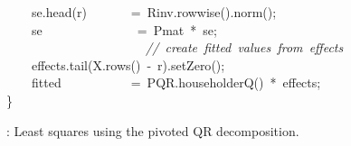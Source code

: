 \documentclass[shortnames,article]{jss}
\newcommand{\hlstd}[1]{\textcolor[rgb]{0,0,0}{#1}}
\newcommand{\hlopt}[1]{\textcolor[rgb]{0,0,0}{#1}}
\newcommand{\hlslc}[1]{\textcolor[rgb]{0.67,0.13,0.13}{\it{#1}}}
\newcommand{\hlkwd}[1]{\textcolor[rgb]{0,0,0}{#1}}
\begin{document}
\begin{figure}[htb]
    \hlstd{}\hlstd{\ \ \ \ }\hlstd{se}\hlopt{.}\hlstd{}\hlkwd{head}\hlstd{}\hlopt{(}\hlstd{r}\hlopt{)}\hlstd{\ \ \ \ \ \ \ }\hlopt{=\ }\hlstd{Rinv}\hlopt{.}\hlstd{}\hlkwd{rowwise}\hlstd{}\hlopt{().}\hlstd{}\hlkwd{norm}\hlstd{}\hlopt{();}\hspace*{\fill}\\
    \hlstd{}\hlstd{\ \ \ \ }\hlstd{se}\hlstd{\ \ \ \ \ \ \ \ \ \ \ \ \ \ \ }\hlstd{}\hlopt{=\ }\hlstd{Pmat\ }\hlopt{{*}\ }\hlstd{se}\hlopt{;}\hspace*{\fill}\\
    \hlstd{}\hlstd{\ \ \ \ \ \ \ \ \ \ \ \ \ \ \ \ \ \ \ \ \ \ }\hlstd{}\hlslc{//\ create\ fitted\ values\ from\ effects}\hspace*{\fill}\\
    \hlstd{}\hlstd{\ \ \ \ }\hlstd{effects}\hlopt{.}\hlstd{}\hlkwd{tail}\hlstd{}\hlopt{(}\hlstd{X}\hlopt{.}\hlstd{}\hlkwd{rows}\hlstd{}\hlopt{()\ {-}\ }\hlstd{r}\hlopt{).}\hlstd{}\hlkwd{setZero}\hlstd{}\hlopt{();}\hspace*{\fill}\\
    \hlstd{}\hlstd{\ \ \ \ }\hlstd{fitted}\hlstd{\ \ \ \ \ \ \ \ \ \ \ }\hlstd{}\hlopt{=\ }\hlstd{PQR}\hlopt{.}\hlstd{}\hlkwd{householderQ}\hlstd{}\hlopt{()\ {*}\ }\hlstd{effects}\hlopt{;}\hspace*{\fill}\\
    \hlstd{}\hlopt{\}}\hlstd{}\hspace*{\fill}\\
    \mbox{}
    \normalfont
    \normalsize
  \caption{: Least squares using the pivoted QR decomposition.}
  \label{ColPivQRLS}
\end{figure}

\end{document}
